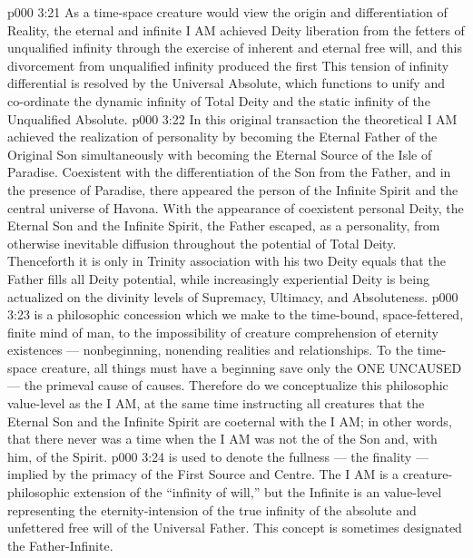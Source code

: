 \vs p000 3:21 As a time\hyp{}space creature would view the origin and differentiation of Reality, the eternal and infinite I AM achieved Deity liberation from the fetters of unqualified infinity through the exercise of inherent and eternal free will, and this divorcement from unqualified infinity produced the first  This tension of infinity differential is resolved by the Universal Absolute, which functions to unify and co\hyp{}ordinate the dynamic infinity of Total Deity and the static infinity of the Unqualified Absolute.
\vs p000 3:22 In this original transaction the theoretical I AM achieved the realization of personality by becoming the Eternal Father of the Original Son simultaneously with becoming the Eternal Source of the Isle of Paradise. Coexistent with the differentiation of the Son from the Father, and in the presence of Paradise, there appeared the person of the Infinite Spirit and the central universe of Havona. With the appearance of coexistent personal Deity, the Eternal Son and the Infinite Spirit, the Father escaped, as a personality, from otherwise inevitable diffusion throughout the potential of Total Deity. Thenceforth it is only in Trinity association with his two Deity equals that the Father fills all Deity potential, while increasingly experiential Deity is being actualized on the divinity levels of Supremacy, Ultimacy, and Absoluteness.
\vs p000 3:23 \pc {} is a philosophic concession which we make to the time\hyp{}bound, space\hyp{}fettered, finite mind of man, to the impossibility of creature comprehension of eternity existences --- nonbeginning, nonending realities and relationships. To the time\hyp{}space creature, all things must have a beginning save only the ONE UNCAUSED --- the primeval cause of causes. Therefore do we conceptualize this philosophic value\hyp{}level as the I AM, at the same time instructing all creatures that the Eternal Son and the Infinite Spirit are coeternal with the I AM; in other words, that there never was a time when the I AM was not the  of the Son and, with him, of the Spirit.
\vs p000 3:24 \pc {} is used to denote the fullness --- the finality --- implied by the primacy of the First Source and Centre. The  I AM is a creature\hyp{}philosophic extension of the “infinity of will,” but the Infinite is an  value\hyp{}level representing the eternity\hyp{}intension of the true infinity of the absolute and unfettered free will of the Universal Father. This concept is sometimes designated the Father\hyp{}Infinite.
